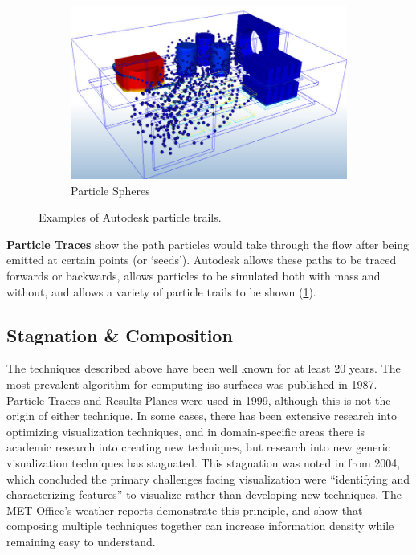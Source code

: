 \begin{figure}
    \begin{subfigure}{0.9\textwidth}%
        \includegraphics[width=\linewidth]{Ch20Research/figures/autodesk_particle_spheres.jpg}
        \caption{Particle Spheres}
    \end{subfigure}%
    \caption{Examples of Autodesk particle trails.}
    \label{fig:AutodeskCFDParticles}
\end{figure}

\textbf{Particle Traces} show the path particles would take through the flow after being emitted at certain points (or `seeds').
Autodesk allows these paths to be traced forwards or backwards, allows particles to be simulated both with mass and without, and allows a variety of particle trails to be shown (\cref{fig:AutodeskCFDParticles}).

\subsection{Stagnation \& Composition}
The techniques described above have been well known for at least 20 years.
The most prevalent algorithm for computing iso-surfaces was published in 1987\cite{LorensenMarching}.
Particle Traces and Results Planes were used in 1999\cite{Schulz1999}, although this is not the origin of either technique.
In some cases, there has been extensive research into optimizing visualization techniques\cite{Ueng1996}, and in domain-specific areas there is academic research into creating new techniques\cite{Chen16}, but research into new generic visualization techniques has stagnated.
This stagnation was noted in \cite{vizRole2004} from 2004, which concluded the primary challenges facing visualization were ``identifying and characterizing features'' to visualize rather than developing new techniques.
The MET Office's weather reports demonstrate this principle, and show that composing multiple techniques together can increase information density while remaining easy to understand.


